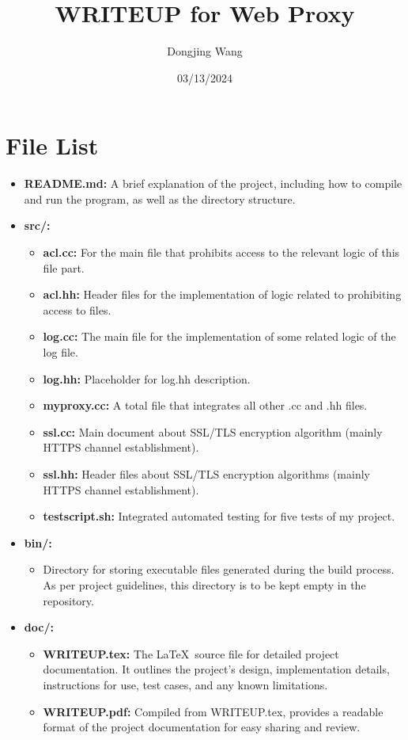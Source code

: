 \documentclass{article}
\title{WRITEUP for Web Proxy}
\author{Dongjing Wang}
\date{03/13/2024}
\begin{document}
\maketitle

\section*{File List}
\begin{itemize}
    \item \textbf{README.md:} A brief explanation of the project, including how to compile and run the program, as well as the directory structure.
    \item \textbf{src/:}
    \begin{itemize}
        \item \textbf{acl.cc:} For the main file that prohibits access to the relevant logic of this file part.
        \item \textbf{acl.hh:} Header files for the implementation of logic related to prohibiting access to files.
        \item \textbf{log.cc:} The main file for the implementation of some related logic of the log file.
        \item \textbf{log.hh:} Placeholder for log.hh description.
        \item \textbf{myproxy.cc:} A total file that integrates all other .cc and .hh files.
        \item \textbf{ssl.cc:} Main document about SSL/TLS encryption algorithm (mainly HTTPS channel establishment).
        \item \textbf{ssl.hh:} Header files about SSL/TLS encryption algorithms (mainly HTTPS channel establishment).
        \item \textbf{testscript.sh:} Integrated automated testing for five tests of my project.
    \end{itemize}
    \item \textbf{bin/:}
    \begin{itemize}
        \item Directory for storing executable files generated during the build process. As per project guidelines, this directory is to be kept empty in the repository.
    \end{itemize}
    \item \textbf{doc/:}
    \begin{itemize}
        \item \textbf{WRITEUP.tex:} The \LaTeX\ source file for detailed project documentation. It outlines the project's design, implementation details, instructions for use, test cases, and any known limitations.
        \item \textbf{WRITEUP.pdf:} Compiled from WRITEUP.tex, provides a readable format of the project documentation for easy sharing and review.
    \end{itemize}
\end{itemize}
\end{document}
